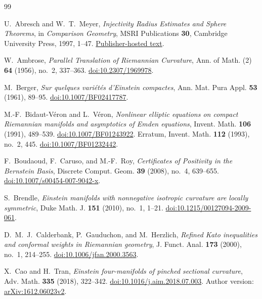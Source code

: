 \begin{thebibliography}{99}
\raggedright
{}

U.~Abresch and W.~T.~Meyer, \emph{Injectivity Radius Estimates and Sphere Theorems}, in \emph{Comparison Geometry}, MSRI Publications \textbf{30}, Cambridge University Press, 1997, 1--47.
\href{https://library.slmath.org/books/Book30/files/abresch.pdf}{Publisher-hosted text}.

W.~Ambrose, \emph{Parallel Translation of Riemannian Curvature}, Ann. of Math. (2) \textbf{64} (1956), no.~2, 337--363.
\href{https://doi.org/10.2307/1969978}{doi:10.2307/1969978}.

M.~Berger, \emph{Sur quelques vari\'et\'es d'Einstein compactes}, Ann. Mat. Pura Appl. \textbf{53} (1961), 89--95.
\href{https://doi.org/10.1007/BF02417787}{doi:10.1007/BF02417787}.

M.-F.~Bidaut-V\'eron and L.~V\'eron,
\emph{Nonlinear elliptic equations on compact Riemannian manifolds and asymptotics of Emden equations},
Invent. Math. \textbf{106} (1991), 489--539.
\href{https://doi.org/10.1007/BF01243922}{doi:10.1007/BF01243922}.
Erratum, Invent. Math. \textbf{112} (1993), no.~2, 445.
\href{https://doi.org/10.1007/BF01232442}{doi:10.1007/BF01232442}.

F.~Boudaoud, F.~Caruso, and M.-F.~Roy, \emph{Certificates of Positivity in the Bernstein Basis}, Discrete Comput. Geom. \textbf{39} (2008), no.~4, 639--655.
\href{https://doi.org/10.1007/s00454-007-9042-x}{doi:10.1007/s00454-007-9042-x}.

S.~Brendle, \emph{Einstein manifolds with nonnegative isotropic curvature are locally symmetric}, Duke Math. J. \textbf{151} (2010), no.~1, 1--21.
\href{https://doi.org/10.1215/00127094-2009-061}{doi:10.1215/00127094-2009-061}.

D.~M.~J.~Calderbank, P.~Gauduchon, and M.~Herzlich, \emph{Refined Kato inequalities and conformal weights in Riemannian geometry}, J. Funct. Anal. \textbf{173} (2000), no.~1, 214--255.
\href{https://doi.org/10.1006/jfan.2000.3563}{doi:10.1006/jfan.2000.3563}.

X.~Cao and H.~Tran, \emph{Einstein four-manifolds of pinched sectional curvature}, Adv. Math. \textbf{335} (2018), 322--342.
\href{https://doi.org/10.1016/j.aim.2018.07.003}{doi:10.1016/j.aim.2018.07.003}.
Author version: \href{https://arxiv.org/abs/1612.06023v2}{arXiv:1612.06023v2}.


\end{thebibliography}

